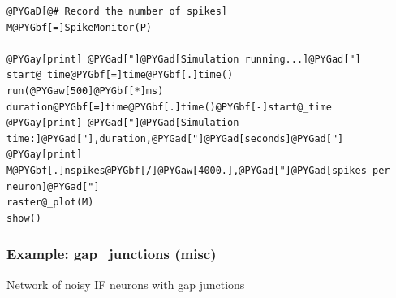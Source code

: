 \documentclass[letterpaper,10pt,english]{manual}
\begin{document}
\begin{Verbatim}[commandchars=@\[\]]
@PYGaD[@# Record the number of spikes]
M@PYGbf[=]SpikeMonitor(P)

@PYGay[print] @PYGad["]@PYGad[Simulation running...]@PYGad["]
start@_time@PYGbf[=]time@PYGbf[.]time()
run(@PYGaw[500]@PYGbf[*]ms)
duration@PYGbf[=]time@PYGbf[.]time()@PYGbf[-]start@_time
@PYGay[print] @PYGad["]@PYGad[Simulation time:]@PYGad["],duration,@PYGad["]@PYGad[seconds]@PYGad["]
@PYGay[print] M@PYGbf[.]nspikes@PYGbf[/]@PYGaw[4000.],@PYGad["]@PYGad[spikes per neuron]@PYGad["]
raster@_plot(M)
show()
\end{Verbatim}

\resetcurrentobjects
\hypertarget{--doc-examples-misc_gap_junctions}{}

\hypertarget{index-65}{}\subsubsection{Example: gap\_junctions (misc)}

Network of noisy IF neurons with gap junctions
\end{document}
